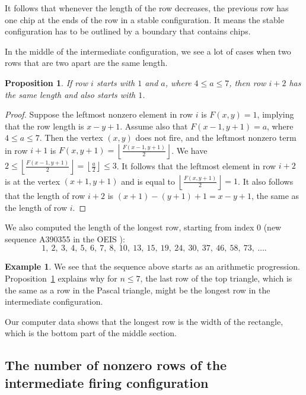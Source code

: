 \documentclass[11pt]{article}
\newtheorem{proposition}[theorem]{Proposition}
\theoremstyle{definition}
\newtheorem{example}{Example}
\theoremstyle{remark}
\newcommand{\floor}[1]{\left\lfloor #1 \right\rfloor}
\begin{document}
It follows that whenever the length of the row decreases, the previous row has one chip at the ends of the row in a stable configuration. It means the stable configuration has to be outlined by a boundary that contains chips.

In the middle of the intermediate configuration, we see a lot of cases when two rows that are two apart are the same length.

\begin{proposition}
\label{prop:rowstarts1a}
    If row $i$ starts with $1$ and $a$, where $4 \le a \le 7$, then row $i+2$ has the same length and also starts with $1$.
\end{proposition}

\begin{proof}
    Suppose the leftmost nonzero element in row $i$ is $F(x,y) = 1$, implying that the row length is $x-y+1$. Assume also that $F(x-1,y+1) = a$, where $4 \le a \le 7$. Then the vertex $(x,y)$ does not fire, and the leftmost nonzero term in row $i+1$ is $F(x,y+1) = \floor{\frac{F(x-1,y+1)}{2}}$. We have $2 \le \floor{\frac{F(x-1,y+1)}{2}} = \floor{\frac{a}{2}} \le 3$. It follows that the leftmost element in row $i+2$ is at the vertex $(x+1,y+1)$ and is equal to $\floor{\frac{F(x,y+1)}{2}} = 1$. It also follows that the length of row $i+2$ is $(x+1) - (y+1) + 1 = x-y+1$, the same as the length of row $i$.
\end{proof}

We also computed the length of the longest row, starting from index 0 (new sequence A390355 in the OEIS \cite{oeis}):
\[1,\ 2,\ 3,\ 4,\ 5,\ 6,\ 7,\ 8,\ 10,\ 13,\ 15,\ 19,\ 24,\ 30,\ 37,\ 46,\ 58,\ 73,\ \ldots .\]

\begin{example}
    We see that the sequence above starts as an arithmetic progression. Proposition~\ref{prop:rowstarts1a} explains why for $n \le 7$, the last row of the top triangle, which is the same as a row in the Pascal triangle, might be the longest row in the intermediate configuration.
\end{example}

Our computer data shows that the longest row is the width of the rectangle, which is the bottom part of the middle section.


\subsection{The number of nonzero rows of the intermediate firing configuration}
\end{document}
